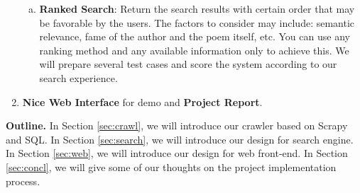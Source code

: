 \begin{enumerate}
\begin{enumerate}[a)]
          \item \textbf{Ranked Search}: Return the search results with certain order that may be favorable by the users. The factors to consider may include: semantic relevance, fame of the author and the poem itself, etc. You can use any ranking method and any available information only to achieve this. We will prepare several test cases and score the system according to our search experience.
        \end{enumerate}
  \item \textbf{Nice Web Interface} for demo and \textbf{Project Report}.
\end{enumerate}





\noindent \textbf{Outline.} In Section \ref{sec:crawl}, we will introduce our crawler based on Scrapy and SQL. In Section \ref{sec:search}, we will introduce our design for search engine. In Section \ref{sec:web}, we will introduce our design for web front-end. In Section \ref{sec:concl}, we will give some of our thoughts on the project implementation process.